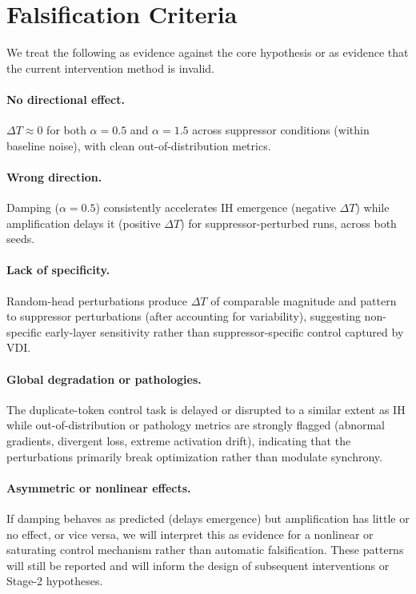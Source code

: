 \documentclass[11pt]{article}
\begin{document}
\section{Falsification Criteria}

We treat the following as evidence against the core hypothesis or as evidence that the current intervention method is invalid.

\paragraph{No directional effect.}
$\Delta T \approx 0$ for both $\alpha = 0.5$ and $\alpha = 1.5$ across suppressor conditions (within baseline noise), with clean out-of-distribution metrics.

\paragraph{Wrong direction.}
Damping ($\alpha = 0.5$) consistently accelerates IH emergence (negative $\Delta T$) while amplification delays it (positive $\Delta T$) for suppressor-perturbed runs, across both seeds.

\paragraph{Lack of specificity.}
Random-head perturbations produce $\Delta T$ of comparable magnitude and pattern to suppressor perturbations (after accounting for variability), suggesting non-specific early-layer sensitivity rather than suppressor-specific control captured by VDI.

\paragraph{Global degradation or pathologies.}
The duplicate-token control task is delayed or disrupted to a similar extent as IH while out-of-distribution or pathology metrics are strongly flagged (abnormal gradients, divergent loss, extreme activation drift), indicating that the perturbations primarily break optimization rather than modulate synchrony.

\paragraph{Asymmetric or nonlinear effects.}
If damping behaves as predicted (delays emergence) but amplification has little or no effect, or vice versa, we will interpret this as evidence for a nonlinear or saturating control mechanism rather than automatic falsification. These patterns will still be reported and will inform the design of subsequent interventions or Stage-2 hypotheses.
\end{document}
